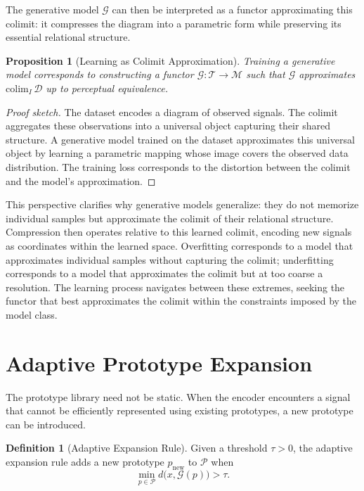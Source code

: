 \documentclass[11pt,a4paper]{article}
\newtheorem{proposition}[theorem]{Proposition}
\theoremstyle{definition}
\newtheorem{definition}[theorem]{Definition}
\theoremstyle{remark}
\begin{document}
The generative model $\mathcal{G}$ can then be interpreted as a functor approximating this colimit: it compresses the diagram into a parametric form while preserving its essential relational structure.

\begin{proposition}[Learning as Colimit Approximation]
Training a generative model corresponds to constructing a functor $\mathcal{G} : \mathcal{T} \rightarrow \mathcal{M}$ such that $\mathcal{G}$ approximates $\mathrm{colim}_I \, \mathcal{D}$ up to perceptual equivalence.
\end{proposition}

\begin{proof}[Proof sketch]
The dataset encodes a diagram of observed signals. The colimit aggregates these observations into a universal object capturing their shared structure. A generative model trained on the dataset approximates this universal object by learning a parametric mapping whose image covers the observed data distribution. The training loss corresponds to the distortion between the colimit and the model's approximation.
\end{proof}

This perspective clarifies why generative models generalize: they do not memorize individual samples but approximate the colimit of their relational structure. Compression then operates relative to this learned colimit, encoding new signals as coordinates within the learned space. Overfitting corresponds to a model that approximates individual samples without capturing the colimit; underfitting corresponds to a model that approximates the colimit but at too coarse a resolution. The learning process navigates between these extremes, seeking the functor that best approximates the colimit within the constraints imposed by the model class.

\section{Adaptive Prototype Expansion}
\label{sec:adaptive}

The prototype library need not be static. When the encoder encounters a signal that cannot be efficiently represented using existing prototypes, a new prototype can be introduced.

\begin{definition}[Adaptive Expansion Rule]
Given a threshold $\tau > 0$, the adaptive expansion rule adds a new prototype $p_{\mathrm{new}}$ to $\mathcal{P}$ when
\[
\min_{p \in \mathcal{P}} d\big(x, \mathcal{G}(p)\big) > \tau.
\]
\end{definition}
\end{document}
